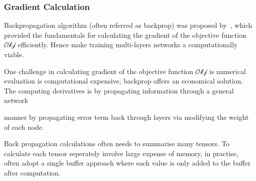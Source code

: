\subsubsection{Gradient Calculation}
Backpropagation algorithm (often referred as backprop) was proposed by~\citet{werbos1975beyond}, which provided the fundamentals for calculating the gradient of the objective function $\mathcal{Obj}$ efficiently. Hence make training multi-layers networks a computationally viable. 
\par
One challenge in calculating gradient of the objective function $\mathcal{Obj}$ is numerical evaluation is computational expensive, backprop offers an economical solution. The computing derivatives is by propagating information through a general network 

manner by propagating error term back through layers via modifying the weight of each node. 
\par 
Back propagation calculations often needs to summarise many tensors. To calculate each tensor seperately involve large expense of memory, in practise, often adopt a single buffer approach where each value is only added to the buffer after computation.